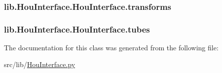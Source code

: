 \hypertarget{classlib_1_1_hou_interface_1_1_hou_interface_a5b5ecd036072bb983603357bb0e8448a}{
\subsubsection[{transforms}]{\setlength{\rightskip}{0pt plus 5cm}lib.\-Hou\-Interface.\-Hou\-Interface.\-transforms}}\label{classlib_1_1_hou_interface_1_1_hou_interface_a5b5ecd036072bb983603357bb0e8448a}
\hypertarget{classlib_1_1_hou_interface_1_1_hou_interface_a99bd22f731ba051db3d9a43afb945566}{
\subsubsection[{tubes}]{\setlength{\rightskip}{0pt plus 5cm}lib.\-Hou\-Interface.\-Hou\-Interface.\-tubes}}\label{classlib_1_1_hou_interface_1_1_hou_interface_a99bd22f731ba051db3d9a43afb945566}


The documentation for this class was generated from the following file\-:\begin{DoxyCompactItemize}
\item 
src/lib/\hyperlink{_hou_interface_8py}{Hou\-Interface.\-py}\end{DoxyCompactItemize}
